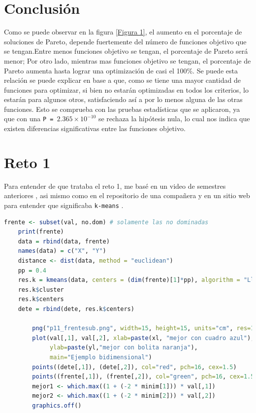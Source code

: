 \documentclass{article}
\begin{document}
\section{Conclusi\'on}
Como se puede observar en la figura \ref{Figura 1}, el aumento en el porcentaje de soluciones de Pareto, depende fuertemente del n\'umero de funciones objetivo que se tengan.\newline Entre menos funciones objetivo se tengan, el porcentaje de Pareto ser\'a menor; Por otro lado, mientras mas funciones objetivo se tengan, el porcentaje de Pareto aumenta hasta lograr una optimizaci\'on de casi el 100\%.
Se puede esta relaci\'on se puede explicar en base a que, como se tiene una mayor cantidad de funciones para optimizar, si bien no estar\'an optimizadas en todos los criterios, lo estar\'an para algunos otros, satisfaciendo as\'i a por lo menos alguna de las otras funciones.\newline
Esto se comprueba con las pruebas estad\'isticas que se aplicaron, ya que con una \texttt{P = $2.365\times 10^{-10}$} se rechaza la hip\'otesis nula, lo cual nos indica que existen diferencias significativas entre las funciones objetivo.



\section{Reto 1}
Para entender de que trataba el reto 1, me bas\'e en un video de semestres anteriores \cite{reto1}, asi mismo como en el repositorio de una compañera \cite{repofabiola} y en un sitio web para entender que significaba \texttt{k-means} \cite{teoria}.

\begin{lstlisting}[language=R, caption= Segmento de c\'odigo reto 1.]
frente <- subset(val, no.dom) # solamente las no dominadas
    print(frente)
    data = rbind(data, frente)
    names(data) = c("X", "Y")
    distance <- dist(data, method = "euclidean")
    pp = 0.4
    res.k = kmeans(data, centers = (dim(frente)[1]*pp), algorithm = "Lloyd")
    res.k$cluster
    res.k$centers    
    dete = rbind(dete, res.k$centers)
    
        png("p11_frentesub.png", width=15, height=15, units="cm", res=1200)
        plot(val[,1], val[,2], xlab=paste(xl, "mejor con cuadro azul"),
             ylab=paste(yl,"mejor con bolita naranja"),
             main="Ejemplo bidimensional")
        points((dete[,1]), (dete[,2]), col="red", pch=16, cex=1.5)
        points((frente[,1]), (frente[,2]), col="green", pch=16, cex=1.5)
        mejor1 <- which.max((1 + (-2 * minim[1])) * val[,1])
        mejor2 <- which.max((1 + (-2 * minim[2])) * val[,2])
        graphics.off()
\end{lstlisting}
\end{document}
